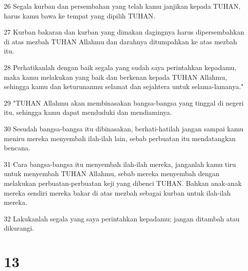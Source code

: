 \par 26 Segala kurban dan persembahan yang telah kamu janjikan kepada TUHAN, harus kamu bawa ke tempat yang dipilih TUHAN.
\par 27 Kurban bakaran dan kurban yang dimakan dagingnya harus dipersembahkan di atas mezbah TUHAN Allahmu dan darahnya ditumpahkan ke atas mezbah itu.
\par 28 Perhatikanlah dengan baik segala yang sudah saya perintahkan kepadamu, maka kamu melakukan yang baik dan berkenan kepada TUHAN Allahmu, sehingga kamu dan keturunanmu selamat dan sejahtera untuk selama-lamanya."
\par 29 "TUHAN Allahmu akan membinasakan bangsa-bangsa yang tinggal di negeri itu, sehingga kamu dapat menduduki dan mendiaminya.
\par 30 Sesudah bangsa-bangsa itu dibinasakan, berhati-hatilah jangan sampai kamu meniru mereka menyembah ilah-ilah lain, sebab perbuatan itu mendatangkan bencana.
\par 31 Cara bangsa-bangsa itu menyembah ilah-ilah mereka, janganlah kamu tiru untuk menyembah TUHAN Allahmu, sebab mereka menyembah dengan melakukan perbuatan-perbuatan keji yang dibenci TUHAN. Bahkan anak-anak mereka sendiri mereka bakar di atas mezbah sebagai kurban untuk ilah-ilah mereka.
\par 32 Lakukanlah segala yang saya perintahkan kepadamu; jangan ditambah atau dikurangi.

\chapter{13}

